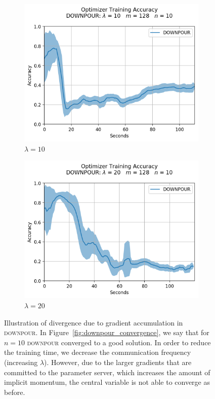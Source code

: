 \begin{figure}[H]
\begin{subfigure}{.49\textwidth}
    \includegraphics[width=\linewidth]{resources/images/downpour_accumulated_10}
    \caption{$\lambda = 10$}
  \end{subfigure}
  \begin{subfigure}{.49\textwidth}
    \centering
    \includegraphics[width=\linewidth]{resources/images/downpour_accumulated_20}
    \caption{$\lambda = 20$}
  \end{subfigure}
  \caption{Illustration of divergence due to gradient accumulation in \textsc{downpour}. In Figure~\ref{fig:downpour_convergence}, we say that for $n = 10$ \textsc{downpour} converged to a good solution. In order to reduce the training time, we decrease the communication frequency (increasing $\lambda$). However, due to the larger gradients that are committed to the parameter server, which increases the amount of implicit momentum, the central variable is not able to converge as before.}
  \label{fig:downpour_accumulated_divergence}
\end{figure}

